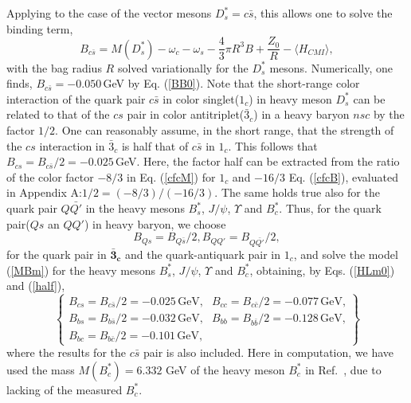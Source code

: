 \documentclass[12pt,prd,onecolumn,floatfix,nofootinbib]{revtex4}
\begin{document}
Applying to the case of the vector mesons $D_{s}^{\ast }=c\bar{s}$, this
allows one to solve the binding term,
\begin{equation}
B_{c\bar{s}}=M(D_{s}^{\ast })-\omega _{c}-\omega _{s}-\frac{4}{3}\pi R^{3}B+%
\frac{Z_{0}}{R}-\langle H_{CMI}\rangle ,  \label{BB0}
\end{equation}%
with the bag radius $R$ solved variationally for the $D_{s}^{\ast }$ mesons.
Numerically, one finds, $B_{c\bar{s}}=-0.050\,$GeV by Eq. (\ref{BB0}). Note
that the short-range color interaction of the quark pair $c\bar{s}$ in color
singlet($1_{c}$) in heavy meson $D_{s}^{\ast }$ can be related to that of
the $cs$ pair in color antitriplet($\bar{3}_{c}$) in a heavy baryon $nsc$ by
the factor $1/2$. One can reasonably assume, in the short range, that the
strength of the $cs$ interaction in $\bar{3}_{c}$ is half that of $c\bar{s}$
in $1_{c}$. This follows that $B_{cs}=B_{c\bar{s}}/2=-0.025\,$GeV. Here, the
factor half can be extracted from the ratio of the color factor $-8/3$ in
Eq. (\ref{cfcM}) for $1_{c}$ and $-16/3$ Eq. (\ref{cfcB}), evaluated in
Appendix A:$1/2=(-8/3)/(-16/3)$. The same holds true also for the quark pair
$Q\bar{Q\prime }$ in the heavy mesons $B_{s}^{\ast }$, $J/\psi $, $\Upsilon $
and $B_{c}^{\ast }$. Thus, for the quark pair($Qs$ an $QQ\prime $) in heavy
baryon, we choose
\begin{equation}
B_{Qs}=B_{Q\bar{s}}/2,B_{QQ\prime }=B_{Q\bar{Q\prime }}/2,  \label{half}
\end{equation}%
for the quark pair in $\boldsymbol{\bar{3}_{c}}$ and the quark-antiquark
pair in $1_{c}$, and solve the model (\ref{MBm}) for the heavy mesons $%
B_{s}^{\ast }$, $J/\psi $, $\Upsilon $ and $B_{c}^{\ast }$, obtaining, by
Eqs. (\ref{HLm0}) and (\ref{half}),
\begin{equation}
\begin{Bmatrix}
B_{cs}=B_{c\bar{s}}/2=-0.025\,\text{GeV,} & B_{cc}=B_{c\bar{c}}/2=-0.077\,%
\text{GeV,} \\
B_{bs}=B_{b\bar{s}}/2=-0.032\,\text{GeV,} & B_{bb}=B_{b\bar{b}}/2=-0.128\,%
\text{GeV,} \\
B_{bc}=B_{b\bar{c}}/2=-0.101\,\text{GeV,} &
\end{Bmatrix}
\label{Bcs}
\end{equation}%
where the results for the $c\bar{s}$ pair is also included. Here in
computation, we have used the mass $M(B_{c}^{\ast })=6.332$ GeV of the heavy
meson $B_{c}^{\ast }$ in Ref.~\cite{Ebert:2002pp}, due to lacking of the
measured $B_{c}^{\ast }$.
\end{document}
